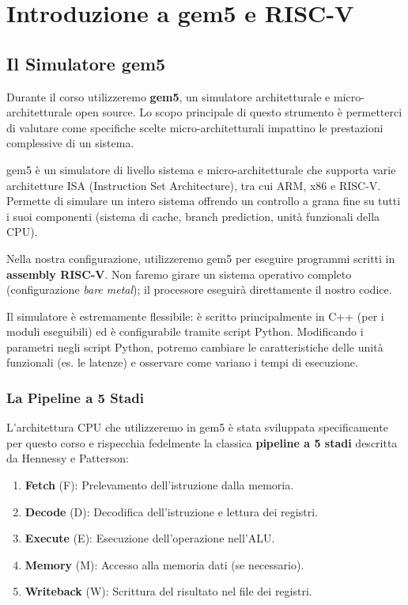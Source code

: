 \chapter{Introduzione a gem5 e RISC-V}

\section{Il Simulatore gem5}
Durante il corso utilizzeremo \textbf{gem5}, un simulatore architetturale e micro-architetturale open source. Lo scopo principale di questo strumento è permetterci di valutare come specifiche scelte micro-architetturali impattino le prestazioni complessive di un sistema.

\begin{definition}
gem5 è un simulatore di livello sistema e micro-architetturale che supporta varie architetture ISA (Instruction Set Architecture), tra cui ARM, x86 e RISC-V. Permette di simulare un intero sistema offrendo un controllo a grana fine su tutti i suoi componenti (sistema di cache, branch prediction, unità funzionali della CPU).
\end{definition}

Nella nostra configurazione, utilizzeremo gem5 per eseguire programmi scritti in \textbf{assembly RISC-V}. Non faremo girare un sistema operativo completo (configurazione \textit{bare metal}); il processore eseguirà direttamente il nostro codice. 

Il simulatore è estremamente flessibile: è scritto principalmente in C++ (per i moduli eseguibili) ed è configurabile tramite script Python. Modificando i parametri negli script Python, potremo cambiare le caratteristiche delle unità funzionali (es. le latenze) e osservare come variano i tempi di esecuzione.

\subsection{La Pipeline a 5 Stadi}
L'architettura CPU che utilizzeremo in gem5 è stata sviluppata specificamente per questo corso e rispecchia fedelmente la classica \textbf{pipeline a 5 stadi} descritta da Hennessy e Patterson:
\begin{enumerate}
    \item \textbf{Fetch} (F): Prelevamento dell'istruzione dalla memoria.
    \item \textbf{Decode} (D): Decodifica dell'istruzione e lettura dei registri.
    \item \textbf{Execute} (E): Esecuzione dell'operazione nell'ALU.
    \item \textbf{Memory} (M): Accesso alla memoria dati (se necessario).
    \item \textbf{Writeback} (W): Scrittura del risultato nel file dei registri.
\end{enumerate}


